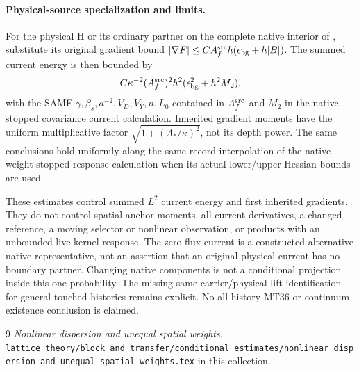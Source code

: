 \documentclass[11pt]{article}
\begin{document}
\paragraph{Physical-source specialization and limits.}
For the physical H or its ordinary partner on the complete native interior of \cite{ND}, substitute
its original gradient bound
$|\nabla F|\le C A_f^{\rm src}h(\epsilon_{\rm bg}+h|B|)$.
The summed current energy is then bounded by
\[
 C\kappa^{-2}(A_f^{\rm src})^2h^2
       (\epsilon_{\rm bg}^2+h^2M_2),
\]
with the SAME $\gamma,\beta_s,a^{-2},V_D,V_Y,n,L_0$ contained in
$A_f^{\rm src}$ and $M_2$ in the native stopped covariance current calculation. Inherited gradient moments have the uniform
multiplicative factor $\sqrt{1+(\Lambda_*/\kappa)^2}$, not its depth power.
The same conclusions hold uniformly along the same-record interpolation of the native weight stopped response calculation
when its actual lower/upper Hessian bounds are used.

These estimates control summed $L^2$ current energy and first inherited gradients.
They do not control spatial anchor moments, all current derivatives, a changed reference,
a moving selector or nonlinear observation, or products with an unbounded live kernel
response. The zero-flux current is a constructed alternative native representative, not
an assertion that an original physical current has no boundary partner. Changing native
components is not a conditional projection inside this one probability. The missing
same-carrier/physical-lift identification for general touched histories remains explicit.
No all-history MT36 or continuum existence conclusion is claimed.
\begin{thebibliography}{9}
 \emph{Nonlinear dispersion and unequal spatial weights}, \texttt{lattice\_theory/block\_and\_transfer/conditional\_estimates/nonlinear\_dispersion\_and\_unequal\_spatial\_weights.tex} in this collection.
\end{thebibliography}
\end{document}
